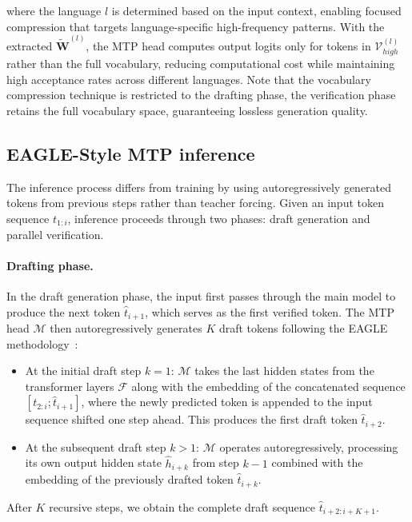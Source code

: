 \documentclass{article} %
\begin{document}
where the language $l$ is determined based on the input context, enabling focused compression that targets language-specific high-frequency patterns. With the extracted $\tilde{\mathbf{W}}^{(l)}$, the MTP head computes output logits only for tokens in $\mathcal{V}_{high}^{(l)}$ rather than the full vocabulary, reducing computational cost while maintaining high acceptance rates across different languages. Note that the vocabulary compression technique is restricted to the drafting phase, the verification phase retains the full vocabulary space, guaranteeing lossless generation quality.


\subsection{EAGLE-Style MTP inference}

The inference process differs from training by using autoregressively generated tokens from previous steps rather than teacher forcing. Given an input token sequence $t_{1:i}$, inference proceeds through two phases: draft generation and parallel verification.

\paragraph{Drafting phase.} In the draft generation phase, the input first passes through the main model to produce the next token $\hat{t}_{i+1}$, which serves as the first verified token. The MTP head $\mathcal{M}$ then autoregressively generates $K$ draft tokens following the EAGLE methodology~\citep{li2024eagle}:

\begin{itemize}
    \item At the initial draft step $k=1$: 
    $\mathcal{M}$ takes the last hidden states from the transformer layers $\mathcal{F}$ along with the embedding of the concatenated sequence $[t_{2:i}; \hat{t}_{i+1}]$, where the newly predicted token is appended to the input sequence shifted one step ahead. This produces the first draft token $\hat{t}_{i+2}$.

    \item At the subsequent draft step $k>1$:
    $\mathcal{M}$ operates autoregressively, processing its own output hidden state $\hat{h}_{i+k}$ from step $k-1$ combined with the embedding of the previously drafted token $\hat{t}_{i+k}$.
\end{itemize}

After $K$ recursive steps, we obtain the complete draft sequence $\hat{t}_{i+2:i+K+1}$.
\end{document}
